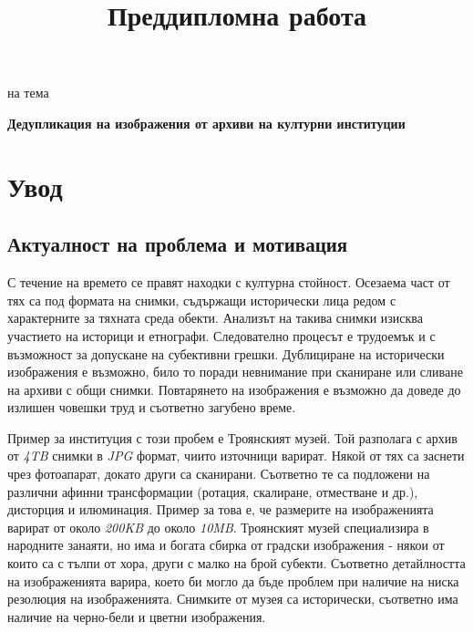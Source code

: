 \documentclass[a4paper,12pt]{article}
\begin{document}
\title{Преддипломна работа}


\maketitle

\begin{center}на тема\end{center}

\begin{center}\textbf{Дедупликация на изображения от архиви на културни институции}\end{center}

\pagebreak

\section{Увод}

\subsection{Актуалност на проблема и мотивация}

С течение на времето се правят находки с културна стойност. Осезаема част от тях са под формата на снимки, съдържащи исторически лица редом с характерните за тяхната среда обекти. Анализът на такива снимки изисква участието на историци и етнографи. Следователно процесът е трудоемък и с възможност за допускане на субективни грешки. Дублициране на исторически изображения е възможно, било то поради невнимание при сканиране или сливане на архиви с общи снимки. Повтарянето на изображения е възможно да доведе до излишен човешки труд и съответно загубено време.

\bigbreak

Пример за институция с този пробем е Троянският музей. Той разполага с архив от \textit{4TB} снимки в \textit{JPG} формат, чиито източници варират. Някой от тях са заснети чрез фотоапарат, докато други са сканирани. Съответно те са подложени на различни афинни трансформации (ротация, скалиране, отместване и др.), дисторция и илюминация. Пример за това е, че размерите на изображенията варират от около \textit{200KB} до около \textit{10MB}. Троянският музей специализира в народните занаяти, но има и богата сбирка от градски изображения - някои от които са с тълпи от хора, други с малко на брой субекти. Съответно детайлността на изображенията варира, което би могло да бъде проблем при наличие на ниска резолюция на изображенията. Снимките от музея са исторически, съответно има наличие на черно-бели и цветни изображения.
\end{document}
